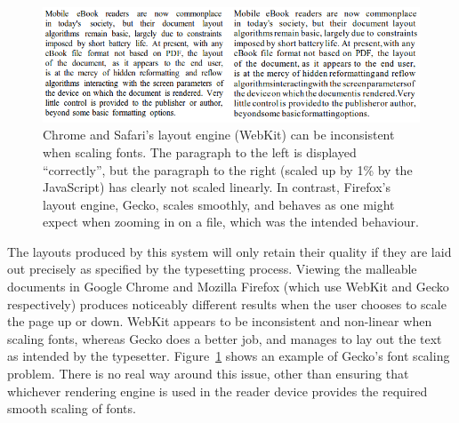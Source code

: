 \begin{figure}
    \includegraphics[width=\textwidth]{gfx/webkitisshit}
    \caption[Inconsistent font scaling by WebKit]{Chrome and Safari's layout engine (WebKit) can be inconsistent when scaling fonts. The paragraph to the left is displayed ``correctly'', but the paragraph to the right (scaled up by 1\% by the JavaScript) has clearly not scaled linearly. In contrast, Firefox's layout engine, Gecko, scales smoothly, and behaves as one might expect when zooming in on a \pdf{} file, which was the intended behaviour.}
    \label{fig:craprenderer}
\end{figure}

The layouts produced by this system will only retain their quality if they are laid out precisely as specified by the typesetting process. Viewing the malleable documents in Google Chrome and Mozilla Firefox (which use WebKit and Gecko respectively) produces noticeably different results when the user chooses to scale the page up or down. WebKit appears to be inconsistent and non-linear when scaling fonts, whereas Gecko does a better job, and manages to lay out the text as intended by the typesetter. Figure~\ref{fig:craprenderer} shows an example of Gecko's font scaling problem. There is no real way around this issue, other than ensuring that whichever rendering engine is used in the reader device provides the required smooth scaling of fonts.









